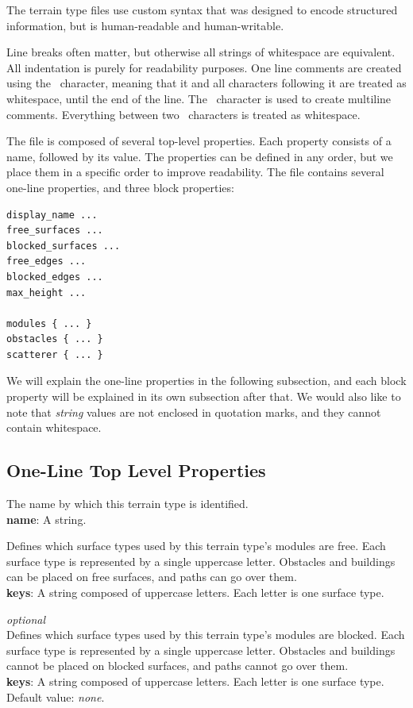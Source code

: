 The terrain type files use custom syntax that was designed to encode structured information, but is human-readable and human-writable.

Line breaks often matter, but otherwise all strings of whitespace are equivalent.
All indentation is purely for readability purposes.
One line comments are created using the \mono{\#}~character, meaning that it and all characters following it are treated as whitespace, until the end of the line.
The \mono{\%}~character is used to create multiline comments.
Everything between two \mono{\%}~characters is treated as whitespace.

The file is composed of several top-level properties.
Each property consists of a name, followed by its value.
The properties can be defined in any order, but we place them in a specific order to improve readability.
The file contains several one-line properties, and three block properties:
\begin{verbatim}
display_name ...
free_surfaces ...
blocked_surfaces ...
free_edges ...
blocked_edges ...
max_height ...

modules { ... }
obstacles { ... }
scatterer { ... }
\end{verbatim}

We will explain the one-line properties in the following subsection, and each block property will be explained in its own subsection after that.
We would also like to note that \emph{string} values are not enclosed in quotation marks, and they cannot contain whitespace.

\subsection{One-Line Top Level Properties}

The name by which this terrain type is identified.\\
\textbf{name}: A string.

Defines which surface types used by this terrain type's modules are free.
Each surface type is represented by a single uppercase letter.
Obstacles and buildings can be placed on free surfaces, and paths can go over them.\\
\textbf{keys}: A string composed of uppercase letters. Each letter is one surface type.

\emph{optional}\\
Defines which surface types used by this terrain type's modules are blocked.
Each surface type is represented by a single uppercase letter.
Obstacles and buildings cannot be placed on blocked surfaces, and paths cannot go over them.\\
\textbf{keys}: A string composed of uppercase letters. Each letter is one surface type.\\
Default value: \emph{none}.


